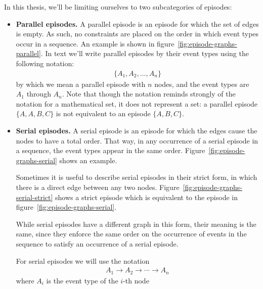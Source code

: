 In this thesis, we'll be limiting ourselves to two subcategories of episodes:
\begin{itemize}
\item \textbf{Parallel episodes.} A parallel episode is an episode for which the set of edges is empty. As such, no constraints are placed on the order in which event types occur in a sequence. An example is shown in figure~\ref{fig:episode-graphs-parallel}. In text we'll write parallel episodes by their event types using the following notation:
\begin{align*}
    \{ A_1, A_2, \ldots, A_n \}
\end{align*}
by which we mean a parallel episode with $ n $ nodes, and the event types are $ A_1 $ through $ A_n $. Note that though the notation reminds strongly of the notation for a mathematical set, it does not represent a set: a parallel episode $ \{ A, A, B, C \} $ is not equivalent to an episode $ \{ A, B, C \} $.

\item \textbf{Serial episodes.} A serial episode is an episode for which the edges cause the nodes to have a total order. That way, in any occurrence of a serial episode in a sequence, the event types appear in the same order. Figure~\ref{fig:episode-graphs-serial} shows an example.

Sometimes it is useful to describe serial episodes in their strict form, in which there is a direct edge between any two nodes. Figure~\ref{fig:episode-graphs-serial-strict} shows a strict episode which is equivalent to the episode in figure~\ref{fig:episode-graphs-serial}.

While serial episodes have a different graph in this form, their meaning is the same, since they enforce the same order on the occurrence of events in the sequence to satisfy an occurrence of a serial episode.

For serial episodes we will use the notation
\begin{align*}
A_1 \to A_2 \to \cdots \to A_n
\end{align*}
where $ A_i $ is the event type of the $ i $-th node

\end{itemize}

